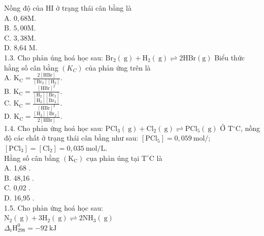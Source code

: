 \documentclass[10pt]{article}
\begin{document}
Nồng độ của HI ở trạng thái cân bằng là\\
A. $0,68 \mathrm{M}$.\\
B. $5,00 \mathrm{M}$.\\
C. $3,38 \mathrm{M}$.\\
D. 8,64 M.\\
1.3. Cho phản úng hoá học sau: $\mathrm{Br}_{2}(\mathrm{~g})+\mathrm{H}_{2}(\mathrm{~g}) \rightleftharpoons 2 \mathrm{HBr}(\mathrm{g})$ Biểu thức hằng số cân bằng $\left(K_{C}\right)$ của phản ứng trên là\\
A. $\mathrm{K}_{\mathrm{C}}=\frac{2[\mathrm{HBr}]}{\left[\mathrm{Br}_{2}\right]\left[\mathrm{H}_{2}\right]}$.\\
B. $\mathrm{K}_{\mathrm{C}}=\frac{[\mathrm{HBr}]^{2}}{\left[\mathrm{H}_{2}\right]\left[\mathrm{Br}_{2}\right]}$.\\
C. $\mathrm{K}_{\mathrm{C}}=\frac{\left[\mathrm{H}_{2}\right]\left[\mathrm{Br}_{2}\right]}{[\mathrm{HBr}]^{2}}$.\\
D. $\mathrm{K}_{\mathrm{C}}=\frac{\left[\mathrm{H}_{2}\right]\left[\mathrm{Br}_{2}\right]}{2[\mathrm{HBr}]}$.\\
1.4. Cho phản ứng hoá học sau: $\mathrm{PCl}_{3}(\mathrm{~g})+\mathrm{Cl}_{2}(\mathrm{~g}) \rightleftharpoons \mathrm{PCl}_{5}(\mathrm{~g})$ Ở $\mathrm{T}{ }^{\circ} \mathrm{C}$, nồng độ các chất ở trạng thái cân bằng như sau: $\left[\mathrm{PCl}_{5}\right]=0,059 \mathrm{~mol} /$; $\left[\mathrm{PCl}_{3}\right]=\left[\mathrm{Cl}_{2}\right]=0,035 \mathrm{~mol} / \mathrm{L}$.\\
Hằng số cân bằng $\left(\mathrm{K}_{\mathrm{C}}\right)$ cụa phản úng tại $\mathrm{T}^{\circ} \mathrm{C}$ là\\
A. 1,68 .\\
B. 48,16 .\\
C. 0,02 .\\
D. 16,95 .\\
1.5. Cho phản ứng hoá học sau:\\
$\mathrm{N}_{2}(\mathrm{~g})+3 \mathrm{H}_{2}(\mathrm{~g}) \rightleftharpoons 2 \mathrm{NH}_{3}(\mathrm{~g})$\\
$\Delta_{\mathrm{r}} \mathrm{H}_{298}^{0}=-92 \mathrm{~kJ}$
\end{document}
